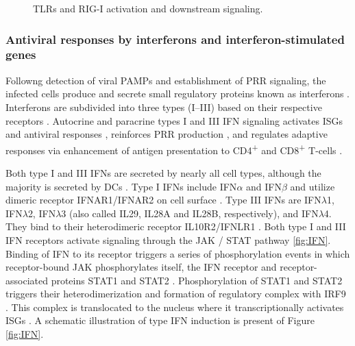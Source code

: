 		\begin{figure}[h]
			\centering
			\caption{\glspl{TLR} and \gls{RIG-I} activation and downstream signaling.} \label{fig:detection}
		\end{figure}	
		
		
		\subsubsection{Antiviral responses by interferons and interferon-stimulated genes}
		
		Followng detection of viral \gls{PAMP}s and establishment of \gls{PRR} signaling, the infected cells produce and secrete small regulatory proteins known as interferons \parencite{Fensterl2009}. Interferons are subdivided into three types (I--III) based on their respective receptors  \parencite{Branca1981, Sheppard2003}. Autocrine and paracrine types I and III \gls{IFN} signaling activates \gls{ISG}s and antiviral responses \parencite{Kotenko2003, Garcia-Sastre2006}, reinforces \gls{PRR} production \parencite{Pothlichet2013}, and regulates adaptive responses via enhancement of antigen presentation to CD4\textsuperscript{+} and CD8\textsuperscript{+} T-cells \parencite{Zietara2009}.
	
		Both type I and III \glspl{IFN} are secreted by nearly all cell types, although the majority is secreted by \glspl{DC} \parencite{Siegal1999, Odendall2014}. Type I \glspl{IFN} include \gls{IFN}$\alpha$ and \gls{IFN}$\beta$ and utilize dimeric receptor IFNAR1/IFNAR2 on cell surface \parencite{Mogensen1999}. Type III \glspl{IFN} are \gls{IFN}$\lambda$1, \gls{IFN}$\lambda$2, \gls{IFN}$\lambda$3 (also called \gls{IL}29, \gls{IL}28A and \gls{IL}28B, respectively), and \gls{IFN}$\lambda$4. They bind to their heterodimeric receptor IL10R2/IFNLR1 \parencite{Kotenko2003, Sheppard2003}. Both type I and III \gls{IFN} receptors activate signaling through the \gls{JAK} / \gls{STAT} pathway \ref{fig:IFN}. Binding of \gls{IFN} to its receptor triggers a series of phosphorylation events in which receptor-bound \gls{JAK} phosphorylates itself, the \gls{IFN} receptor and receptor-associated proteins \gls{STAT}1 and \gls{STAT}2 \parencite{VanBoxel-Dezaire2006}. Phosphorylation of \gls{STAT}1 and \gls{STAT}2 triggers their heterodimerization and formation of regulatory complex with \gls{IRF}9 \parencite{Fu1990}. This complex is translocated to the nucleus where it transcriptionally activates \glspl{ISG} \parencite{Levy1988}. A schematic illustration of type \gls{IFN} induction is present of Figure \ref{fig:IFN}.
		
